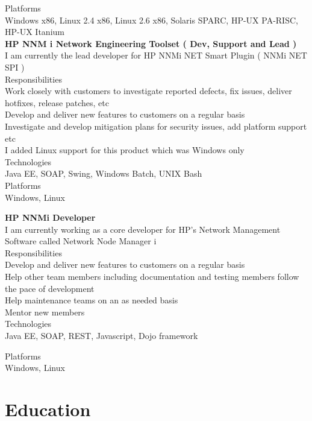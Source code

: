 \documentclass[line,margin]{res}
\begin{document}
\begin{resume}
Platforms\\
Windows x86, Linux 2.4 x86, Linux 2.6 x86, Solaris SPARC, HP-UX PA-RISC, HP-UX Itanium\\

{\bf HP NNM i Network Engineering Toolset ( Dev, Support and Lead )}\\
I am currently the lead developer for HP NNMi NET Smart Plugin ( NNMi NET SPI )\\

Responsibilities\\
Work closely with customers to investigate reported defects, fix issues, deliver hotfixes, release patches, etc\\
Develop and deliver new features to customers on a regular basis\\
Investigate and develop mitigation plans for security issues, add platform support etc\\
I added Linux support for this product which was Windows only\\

Technologies\\
Java EE, SOAP, Swing, Windows Batch, UNIX Bash\\

Platforms\\
Windows, Linux

{\bf HP NNMi Developer}\\
I am currently working as a core developer for HP's Network Management Software called Network Node Manager i\\

Responsibilities\\
Develop and deliver new features to customers on a regular basis\\
Help other team members including documentation and testing members follow the pace of development\\
Help maintenance teams on an as needed basis\\
Mentor new members\\

Technologies\\
Java EE, SOAP, REST, Javascript, Dojo framework

Platforms\\
Windows, Linux

\section{Education}


\end{resume}
\end{document}
